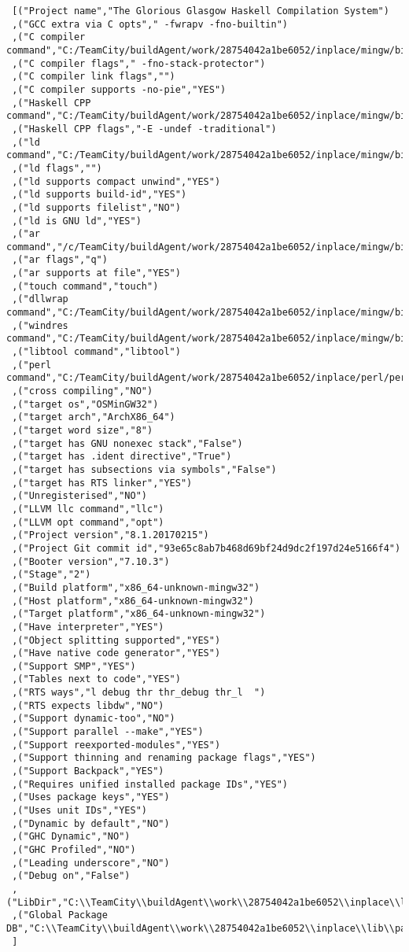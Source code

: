 \begin{verbatim}
 [("Project name","The Glorious Glasgow Haskell Compilation System")
 ,("GCC extra via C opts"," -fwrapv -fno-builtin")
 ,("C compiler command","C:/TeamCity/buildAgent/work/28754042a1be6052/inplace/mingw/bin/gcc.exe")
 ,("C compiler flags"," -fno-stack-protector")
 ,("C compiler link flags","")
 ,("C compiler supports -no-pie","YES")
 ,("Haskell CPP command","C:/TeamCity/buildAgent/work/28754042a1be6052/inplace/mingw/bin/gcc.exe")
 ,("Haskell CPP flags","-E -undef -traditional")
 ,("ld command","C:/TeamCity/buildAgent/work/28754042a1be6052/inplace/mingw/bin/ld.exe")
 ,("ld flags","")
 ,("ld supports compact unwind","YES")
 ,("ld supports build-id","YES")
 ,("ld supports filelist","NO")
 ,("ld is GNU ld","YES")
 ,("ar command","/c/TeamCity/buildAgent/work/28754042a1be6052/inplace/mingw/bin/ar")
 ,("ar flags","q")
 ,("ar supports at file","YES")
 ,("touch command","touch")
 ,("dllwrap command","C:/TeamCity/buildAgent/work/28754042a1be6052/inplace/mingw/bin/dllwrap.exe")
 ,("windres command","C:/TeamCity/buildAgent/work/28754042a1be6052/inplace/mingw/bin/windres.exe")
 ,("libtool command","libtool")
 ,("perl command","C:/TeamCity/buildAgent/work/28754042a1be6052/inplace/perl/perl")
 ,("cross compiling","NO")
 ,("target os","OSMinGW32")
 ,("target arch","ArchX86_64")
 ,("target word size","8")
 ,("target has GNU nonexec stack","False")
 ,("target has .ident directive","True")
 ,("target has subsections via symbols","False")
 ,("target has RTS linker","YES")
 ,("Unregisterised","NO")
 ,("LLVM llc command","llc")
 ,("LLVM opt command","opt")
 ,("Project version","8.1.20170215")
 ,("Project Git commit id","93e65c8ab7b468d69bf24d9dc2f197d24e5166f4")
 ,("Booter version","7.10.3")
 ,("Stage","2")
 ,("Build platform","x86_64-unknown-mingw32")
 ,("Host platform","x86_64-unknown-mingw32")
 ,("Target platform","x86_64-unknown-mingw32")
 ,("Have interpreter","YES")
 ,("Object splitting supported","YES")
 ,("Have native code generator","YES")
 ,("Support SMP","YES")
 ,("Tables next to code","YES")
 ,("RTS ways","l debug thr thr_debug thr_l  ")
 ,("RTS expects libdw","NO")
 ,("Support dynamic-too","NO")
 ,("Support parallel --make","YES")
 ,("Support reexported-modules","YES")
 ,("Support thinning and renaming package flags","YES")
 ,("Support Backpack","YES")
 ,("Requires unified installed package IDs","YES")
 ,("Uses package keys","YES")
 ,("Uses unit IDs","YES")
 ,("Dynamic by default","NO")
 ,("GHC Dynamic","NO")
 ,("GHC Profiled","NO")
 ,("Leading underscore","NO")
 ,("Debug on","False")
 ,("LibDir","C:\\TeamCity\\buildAgent\\work\\28754042a1be6052\\inplace\\lib")
 ,("Global Package DB","C:\\TeamCity\\buildAgent\\work\\28754042a1be6052\\inplace\\lib\\package.conf.d")
 ]
\end{verbatim}
